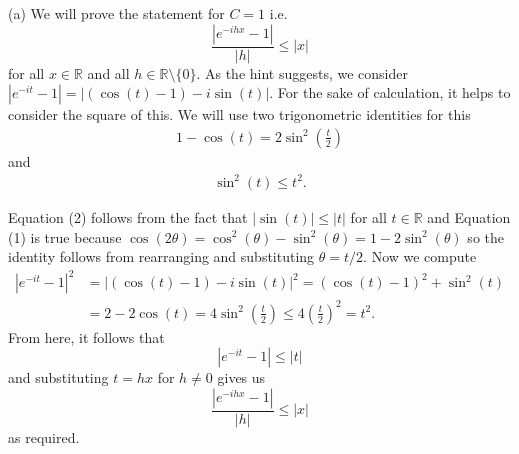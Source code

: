 \documentclass[12pt]{amsart} %
\def\R{\mathbb{R}}
\begin{document}
\newpage
\noindent
  (a) We will prove the statement for $C = 1$ i.e.
$$ \frac {|e^{-ihx}-1|}{|h|} \le |x|$$ 
for all $x\in \R$ and all $h\in \R\setminus\{0\}$. As the hint suggests, we consider $|e^{-it} - 1| = |(\cos(t)-1)- i\sin(t)|$. For the sake of calculation, it helps to consider the square of this. We will use two trigonometric identities for this 
 \begin{align}
	1- \cos(t) = 2\sin^2 \left(  \frac{t}{2}
 \right) 
\end{align} 
and 
\begin{align}
	\sin^2(t)\le t^2.
\end{align}

Equation (2) follows from the fact that $|\sin(t)| \le |t|$ for all $t \in \R$ and Equation (1) is true because $\cos(2\theta) = \cos^2(\theta) - \sin^2(\theta) = 1 - 2\sin^2(\theta)$ so the identity follows from rearranging and substituting $\theta = t/2.$ Now we compute 
\begin{align*}
	|e^{-it} - 1|^2 &= |(\cos(t)-1)- i\sin(t)|^2 = \left( \cos(t) - 1 \right)^2 + \sin^2(t) \\
			&= 2 - 2\cos(t) = 4\sin^2\left( \frac{t}{2} \right) \le 4\left( \frac{t}{2} \right)^2 = t^2. 	
\end{align*}
From here, it follows that $$|e^{-it} - 1| \le  |t|$$ and substituting $t = hx$ for  $h \neq 0$ gives us  $$
\frac{|e^{-ihx} - 1| }{|h|}\le  |x|
$$ as required. 
\end{document}

